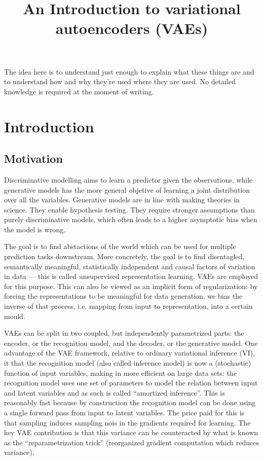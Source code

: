 \documentclass{article}
\title{An Introduction to variational autoencoders (VAEs)}
\begin{document}
\maketitle
The idea here is to understand just enough to explain what these things
are and to understand how and why they're used where they are used.
No detailed knowledge is required at the moment of writing.
\section{Introduction}
\subsection{Motivation}
Discriminative modelling aims to learn a predictor given the observations,
while generative models has the more general objetive of learning a joint
distribution over all the variables.
Generative models are in line with making theories in science.
They enable hypothesis testing.
They require stronger assumptions than purely discriminative models,
which often leads to a higher asymptotic bias when the model is wrong.

The goal is to find abstactions of the world
which can be used for multiple prediction tasks downstream.
More concretely, the goal is to find disentagled,
semantically meaningful, statistically independent and causal factors
of variation in data --- this is called unsupervised representation learning.
VAEs are employed for this purpose.
This can also be viewed as an implicit form of regularization:
by forcing the representations to be meaningful for data generation,
we bias the inverse of that process, i.e. mapping from input to representation,
into a certain mould.

VAEs can be split in two coupled, but independently parametrized parts:
the encoder, or the recognition model,
and the decoder, or the generative model.
One advantage of the VAE framework, relative to ordinary variational inference (VI),
it that the recognition model (also called inference model) is now
a (stochastic) function of input variables, making in more efficient on large
data sets: the recognition model uses one set of parameters to model 
the relation between input and latent variables and as such is called
``amortized inference''.
This is reasonably fast because by construction the recognition model
can be done using a single forward pass from input to latent variables.
The price paid for this is that sampling induces sampling nois in the gradients
required for learning.
The key VAE contribution is that this variance can be counteracted by
what is known as the ``reparametrization trick'' (reorganized gradient computation
which reduces variance).
\end{document}
